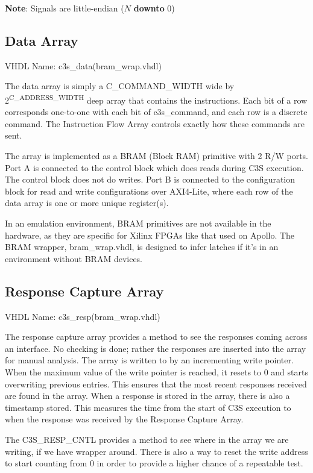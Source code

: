 \textbf{Note}: Signals are little-endian ($N$ \textbf{downto} 0)

\subsection{Data Array}
VHDL Name: c3s\_data(bram\_wrap.vhdl)

The data array is simply a C\_COMMAND\_WIDTH wide by
2\textsuperscript{C\_ADDRESS\_WIDTH} deep array that contains the
instructions. Each bit of a row corresponds one-to-one with each bit
of c3s\_command, and each row is a discrete command. The Instruction
Flow Array controls exactly how these commands are sent.

The array is implemented as a BRAM (Block RAM) primitive with 2 R/W
ports. Port A is connected to the control block which does reads
during C3S execution. The control block does not do writes. Port B is
connected to the configuration block for read and write configurations
over AXI4-Lite, where each row of the data array is one or more unique
register(s).

\begin{emulation}
In an emulation environment, BRAM primitives are not available in the
hardware, as they are specific for Xilinx FPGAs like that used on
Apollo. The BRAM wrapper, bram\_wrap.vhdl, is designed to infer
latches if it's in an environment without BRAM devices.
\end{emulation}

\subsection{Response Capture Array}
VHDL Name: c3s\_resp(bram\_wrap.vhdl)

The response capture array provides a method to see the responses
coming across an interface. No checking is done; rather the responses
are inserted into the array for manual analysis. The array is written
to by an incrementing write pointer. When the maximum value of the
write pointer is reached, it resets to 0 and starts overwriting
previous entries. This ensures that the most recent responses received
are found in the array. When a response is stored in the array, there
is also a timestamp stored. This measures the time from the start of
C3S execution to when the response was received by the Response
Capture Array.

The C3S\_RESP\_CNTL provides a method to see where in the array we are
writing, if we have wrapper around. There is also a way to reset the
write address to start counting from 0 in order to provide a higher
chance of a repeatable test.

